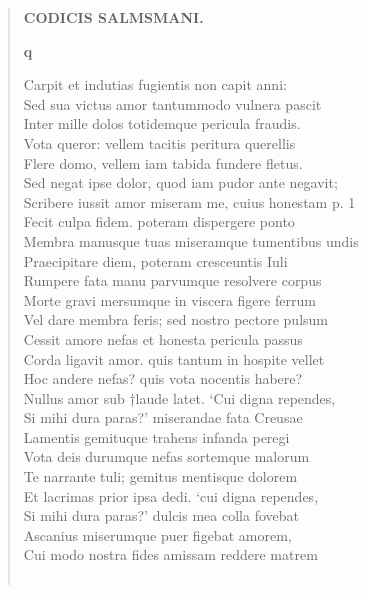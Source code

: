 \documentclass[11pt, a4paper]{report}
\begin{document}
\begin{verse}
    \begin{center} \textbf{CODICIS SALMSMANI.} \end{center}\begin{center} \textbf{q} \end{center}Carpit et indutias fugientis non capit anni: \\ Sed sua victus amor tantummodo vulnera pascit \\ Inter mille dolos totidemque pericula fraudis. \\ Vota queror: vellem tacitis peritura querellis \\ Flere domo, vellem  \lbrack iam \rbrack  tabida fundere fletus. \\ Sed negat ipse dolor, quod iam pudor ante negavit; \\ Scribere iussit amor miseram me, cuius honestam p. 1 \\ Fecit culpa fidem. poteram dispergere ponto \\ Membra manusque tuas miseramque tumentibus undis \\ Praecipitare diem, poteram cresceuntis Iuli \\ Rumpere fata manu parvumque resolvere corpus \\ Morte gravi mersumque in viscera figere ferrum \\ Vel dare membra feris; sed nostro pectore pulsum \\ Cessit amore nefas et honesta pericula passus \\ Corda ligavit amor. quis tantum in hospite vellet \\ Hoc andere nefas? quis vota nocentis habere? \\ Nullus amor sub †laude latet. ‘Cui digna rependes, \\ Si mihi dura paras?’ miserandae fata Creusae \\ Lamentis gemituque trahens infanda peregi \\ Vota deis durumque nefas sortemque malorum \\ Te narrante tuli; gemitus mentisque dolorem \\ Et lacrimas prior ipsa dedi. ‘cui digna rependes, \\ Si mihi dura paras?’ dulcis mea colla fovebat \\ Ascanius miserumque puer figebat amorem, \\ Cui modo nostra fides amissam reddere matrem \\ 
        ﻿\pagebreak 

\end{verse}
\end{document}
